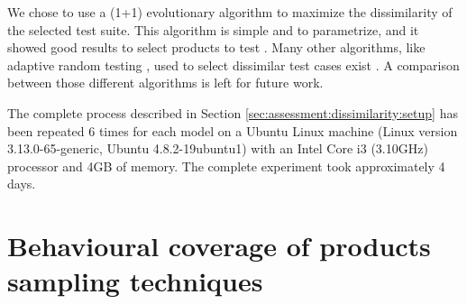 We chose to use a (1+1) evolutionary algorithm \cite{Droste2002} to maximize the dissimilarity of the selected test suite. This algorithm is simple and to parametrize, and it showed good results to select products to test \cite{Henard2014a}. Many other algorithms, like adaptive random testing \cite{Chen2010}, used to select dissimilar test cases exist \cite{Hemmati2013}. A comparison between those different algorithms is left for future work.

The complete process described in Section \ref{sec:assessment:dissimilarity:setup} has been repeated 6 times for each model on a Ubuntu Linux machine (Linux version 3.13.0-65-generic, Ubuntu 4.8.2-19ubuntu1) with an Intel Core i3 (3.10GHz) processor and 4GB of memory. The complete experiment took approximately 4 days.

%



\section{Behavioural coverage of products sampling techniques}

